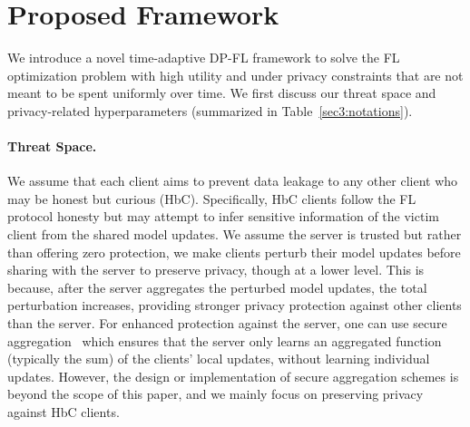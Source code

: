 \section{Proposed Framework}\label{sec:propose}

{We introduce a novel time-adaptive DP-FL framework to solve the FL optimization problem with high utility and under privacy constraints that are not meant to be spent uniformly over time. We first discuss our threat space and privacy-related hyperparameters (summarized in Table~\ref{sec3:notations}).} 

\paragraph{Threat Space.} 
We assume that each client aims to prevent data leakage to any other client who may be honest but curious (HbC). Specifically, HbC clients follow the FL protocol honesty but may attempt to infer sensitive information of the victim client from the shared model updates. We assume the server is trusted but rather than offering zero protection, we make clients perturb their model updates before sharing with the server to preserve privacy, though at a lower level. This is because, after the server aggregates the perturbed model updates, the total perturbation increases, providing stronger privacy protection against other clients than the server. For enhanced protection against the server, one can use secure aggregation~\citep{bonawitz2016practical} which ensures that the server only learns an aggregated function (typically the sum) of the clients' local updates, without learning individual updates. However, the design or implementation of secure aggregation schemes is beyond the scope of this paper, and we mainly focus on preserving privacy against HbC clients.

